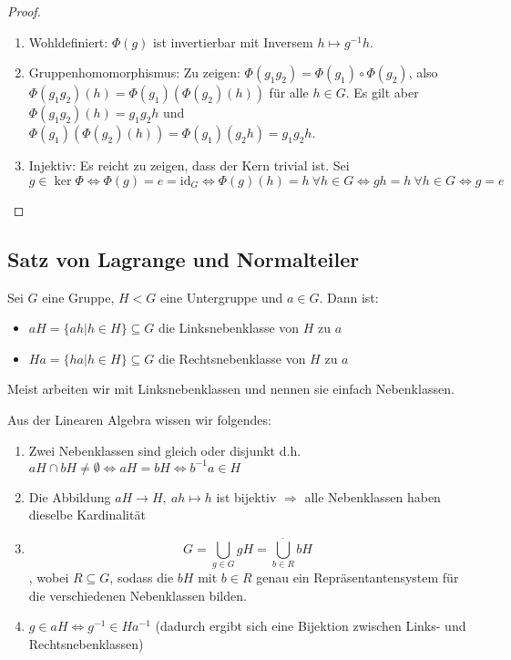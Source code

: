 \documentclass[12pt,a4paper]{scrartcl}
\begin{document}
\begin{proof}
	\leavevmode
	\begin{enumerate}
	\item Wohldefiniert: $\Phi(g)$ ist invertierbar mit Inversem $h\mapsto g^{-1}h$.	
	\item Gruppenhomomorphismus: Zu zeigen: $\Phi(g_1g_2) = \Phi(g_1)\circ \Phi(g_2)$, also $\Phi(g_1g_2)(h) = \Phi(g_1)(\Phi(g_2)(h))$ für alle $h\in G$. Es gilt aber $\Phi(g_1g_2)(h) = g_1g_2h$ und $\Phi(g_1)(\Phi(g_2)(h)) = \Phi(g_1)(g_2h) = g_1g_2h$.
	
	\item Injektiv: Es reicht zu zeigen, dass der Kern trivial ist. Sei $g\in \ker\Phi\Leftrightarrow \Phi(g) = e = \text{id}_G \Leftrightarrow \Phi(g)(h)= h ~ \forall h\in G\Leftrightarrow gh = h ~ \forall h\in G\Leftrightarrow g= e$
	\end{enumerate}
\end{proof}


\subsection{Satz von Lagrange und Normalteiler}
\begin{defi}
	Sei $G$ eine Gruppe, $H<G$ eine Untergruppe und $a\in G$. Dann ist:
	\begin{itemize}
		\item[] $aH = \{ah|h\in H\}\subseteq G$ die Linksnebenklasse von $H$ zu $a$
		\item[] $Ha = \{ha|h\in H\}\subseteq G$ die Rechtsnebenklasse von $H$ zu $a$
	\end{itemize}
	Meist arbeiten wir mit Linksnebenklassen und nennen sie einfach Nebenklassen.
\end{defi}

\noindent
Aus der Linearen Algebra wissen wir folgendes: \begin{enumerate}
	\item Zwei Nebenklassen sind gleich oder disjunkt d.h. $aH\cap bH \neq \emptyset \Leftrightarrow aH = bH\Leftrightarrow b^{-1}a \in H$
	\item Die Abbildung $aH\to H,\ ah\mapsto h$ ist bijektiv $\Rightarrow$ alle Nebenklassen haben dieselbe Kardinalität
	\item $$ G = \bigcup\limits_{g\in G}gH = \overset{.}{\bigcup\limits_{b\in R} }bH$$, wobei $R\subseteq G$, sodass die $bH$ mit $b\in R$ genau ein Repräsentantensystem für die verschiedenen Nebenklassen bilden.
	\item $g\in aH\Leftrightarrow g^{-1}\in Ha^{-1}$ (dadurch ergibt sich eine Bijektion zwischen Links- und Rechtsnebenklassen)
	
\end{enumerate}
\end{document}
